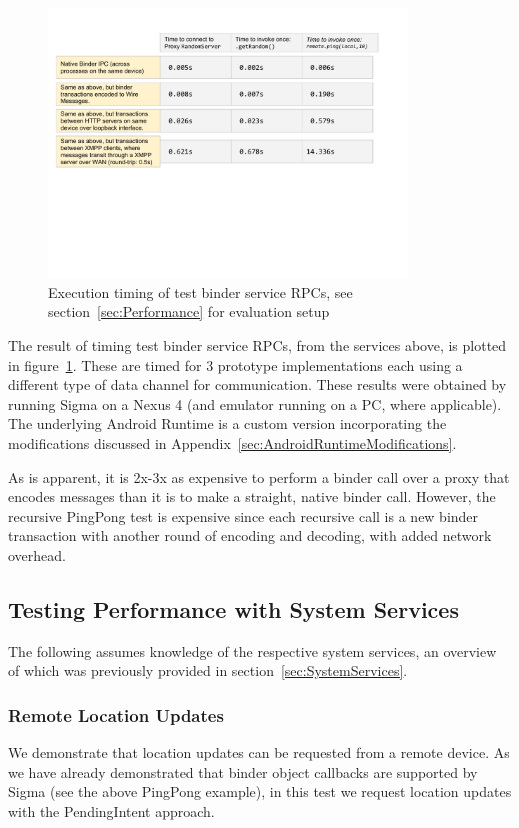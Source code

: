 \documentclass[prodmode]{acmlarge}
\begin{document}
\begin{figure}[h]
\centering
\includegraphics[width=0.85\textwidth]{drawings/Performance.pdf}
\caption{Execution timing of test binder service RPCs, see section~\ref{sec:Performance} for evaluation setup}
\label{fig:performance}
\end{figure}

The result of timing test binder service RPCs, from the services above, is plotted in figure~\ref{fig:performance}. These are timed for 3 prototype implementations each using a different type of data channel for communication. These results were obtained by running Sigma on a Nexus 4 (and emulator running on a PC, where applicable). The underlying Android Runtime is a custom version incorporating the modifications discussed in Appendix~\ref{sec:AndroidRuntimeModifications}.

As is apparent, it is 2x-3x as expensive to perform a binder call over a proxy that encodes messages than it is to make a straight, native binder call. However, the recursive PingPong test is expensive since each recursive call is a new binder transaction with another round of encoding and decoding, with added network overhead.

\subsection{Testing Performance with System Services}

The following assumes knowledge of the respective system services, an overview of which was previously provided in section~\ref{sec:SystemServices}.

\subsubsection{Remote Location Updates}
\label{sec:location_sharing}
We demonstrate that location updates can be requested from a remote device. As we have already demonstrated that binder object callbacks are supported by Sigma (see the above PingPong example), in this test we request location updates with the PendingIntent approach.
\end{document}
